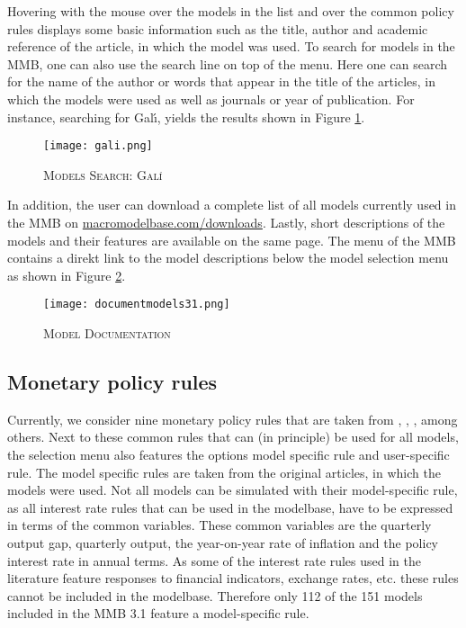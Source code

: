 Hovering with the mouse over the models in the list and over the common policy rules displays some basic information such as the title, author and academic reference of the article, in which the model was used. To search for models in the MMB, one can also use the search line on top of the menu. Here one can search for the name of the author or words that appear in the title of the articles, in which the models were used as well as journals or year of publication. For instance, searching for Gal{\'\i}, yields the results shown in Figure \ref{search}.

\begin{figure}[H]
	\centering
	\caption{\textsc{Models Search: Gal{\'\i}}}
	\vspace{0.2cm}
	\texttt{[image: gali.png]}\\
	\label{search}
\end{figure}

In addition, the user can download a complete list of all models currently used in the MMB on \url{macromodelbase.com/downloads}. Lastly, short descriptions of the models and their features are available on the same page. The menu of the MMB contains a direkt link to the model descriptions below the model selection menu as shown in Figure \ref{docmod}.
\begin{figure}[H]
	\centering
	\caption{\textsc{Model Documentation}}
	\vspace{0.2cm}
	\texttt{[image: documentmodels31.png]}\\
	\label{docmod}
\end{figure}

\subsection*{Monetary policy rules}



Currently, we consider nine monetary policy rules that are taken from \cite{Taylor1993}, \cite{LevinWielandWilliams2003}, \cite{SmetsWouters2007}, among others. Next to these common rules that can (in principle) be used for all models, the selection menu also features the options model specific rule and user-specific rule. 
The model specific rules are taken from the original articles, in which the models were used. Not all models can be simulated with their model-specific rule, as all interest rate rules that can be used in the modelbase, have to be expressed in terms of the common variables. These common variables are the quarterly output gap, quarterly output, the year-on-year rate of inflation and the policy interest rate in annual terms. As some of the interest rate rules used in the literature feature responses to financial indicators, exchange rates, etc. these rules cannot be included in the modelbase. Therefore only 112 of the 151 models included in the MMB 3.1 feature a model-specific rule. 

